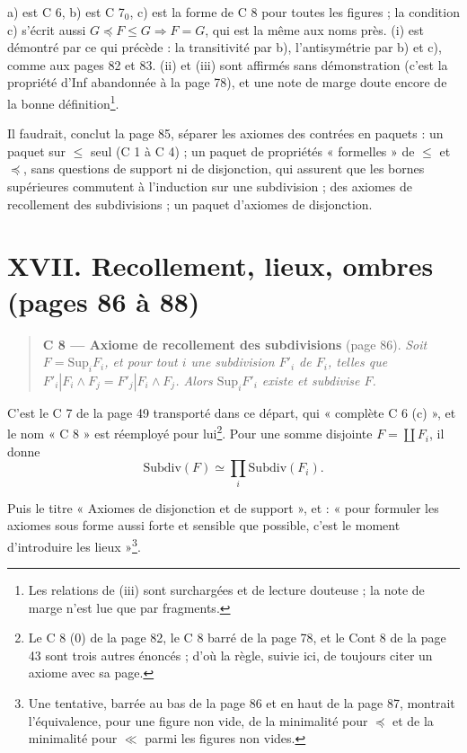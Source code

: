 \documentclass[11pt,a4paper]{article}
\begin{document}
a) est C 6, b) est C 7$_{0}$, c) est la forme de C 8 pour toutes les figures ;
la condition c) s'écrit aussi $G \preccurlyeq F \leq G \Rightarrow F = G$, qui
est la même aux noms près. (i) est démontré par ce qui précède : la
transitivité par b), l'antisymétrie par b) et c), comme aux pages 82 et 83.
(ii) et (iii) sont affirmés sans démonstration (c'est la propriété d'Inf
abandonnée à la page 78), et une note de marge doute encore de la bonne
définition\footnote{Les relations de (iii) sont surchargées et de lecture
douteuse ; la note de marge n'est lue que par fragments.}.

Il faudrait, conclut la page 85, séparer les axiomes des contrées en paquets :
un paquet sur $\leq$ seul (C 1 à C 4) ; un paquet de propriétés « formelles »
de $\leq$ et $\preccurlyeq$, sans questions de support ni de disjonction, qui
assurent que les bornes supérieures commutent à l'induction sur une
subdivision ; des axiomes de recollement des subdivisions ; un paquet d'axiomes
de disjonction.

\section*{XVII. Recollement, lieux, ombres (pages 86 à 88)}

\begin{quote}
\textbf{C 8 --- Axiome de recollement des subdivisions} (page 86). \emph{Soit $F
= \mathrm{Sup}_{i} F_{i}$, et pour tout $i$ une subdivision $F'_{i}$ de $F_{i}$,
telles que $F'_{i}|F_{i} \wedge F_{j} = F'_{j}|F_{i} \wedge F_{j}$. Alors
$\mathrm{Sup}_{i} F'_{i}$ existe et subdivise $F$.}
\end{quote}

C'est le C 7 de la page 49 transporté dans ce départ, qui « complète C 6 (c) »,
et le nom « C 8 » est réemployé pour lui\footnote{Le C 8 (0) de la page 82, le
C 8 barré de la page 78, et le Cont 8 de la page 43 sont trois autres énoncés ;
d'où la règle, suivie ici, de toujours citer un axiome avec sa page.}. Pour une
somme disjointe $F = \coprod F_{i}$, il donne
\[
\mathrm{Subdiv}(F) \simeq \prod_{i} \mathrm{Subdiv}(F_{i}).
\]

Puis le titre « Axiomes de disjonction et de support », et : « pour formuler
les axiomes sous forme aussi forte et sensible que possible, c'est le moment
d'introduire les lieux »\footnote{Une tentative, barrée au bas de la page 86 et
en haut de la page 87, montrait l'équivalence, pour une figure non vide, de la
minimalité pour $\preccurlyeq$ et de la minimalité pour $\ll$ parmi les figures
non vides.}.
\end{document}
